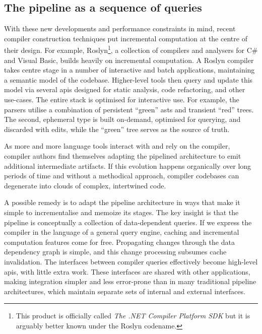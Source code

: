 \subsection{The pipeline as a sequence of queries}

With these new developments and performance constraints in mind, recent compiler
construction techniques put incremental computation at the centre of their
design. For example, Roslyn\footnote{This product is officially called \emph{The
.NET Compiler Platform SDK} but it is arguably better known under the Roslyn
codename.}, a collection of compilers and analysers for C\# and Visual Basic,
builds heavily on incremental computation. A Roslyn compiler takes centre stage
in a number of interactive and batch applications, maintaining a semantic model
of the codebase. Higher-level tools then query and update this model via several
\acrshort{api}s designed for static analysis, code refactoring, and other
use-cases\cite{roslyn-apis}. The entire stack is optimised for interactive use.
For example, the parsers utilise a combination of persistent ``green''
\acrlong{ast}s and transient ``red'' trees. The second, ephemeral type is built
on-demand, optimised for querying, and discarded with
edits\cite{roslyn-red-green-trees}, while the ``green'' tree serves as the
source of truth.

As more and more language tools interact with and rely on the compiler, compiler
authors find themselves adapting the pipelined architecture to emit additional
intermediate artifacts. If this evolution happens organically over long periods
of time and without a methodical approach, compiler codebases can degenerate
into clouds of complex, intertwined code.

A possible remedy is to adapt the pipeline architecture in ways that make it
simple to incrementalise and memoize its stages. The key insight is that the
pipeline is conceptually a collection of data-dependent queries. If we express
the compiler in the language of a general query engine, caching and incremental
computation features come for free. Propagating changes through the data
dependency graph is simple, and this change processing subsumes cache
invalidation. The interfaces between compiler queries effectively become
high-level \acrshort{api}s, with little extra work. These interfaces are shared
with other applications, making integration simpler and less error-prone than in
many traditional pipeline architectures, which maintain separate sets of
internal and external interfaces.

